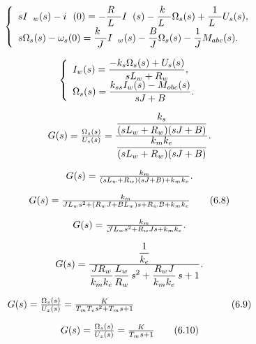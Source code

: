 \documentclass{article}
\begin{document}
\[
$$
\left\{\begin{array} {l} {s I_{\phantom{w} w} ( s )-i_{\phantom{w}} ( 0 )=-\displaystyle\frac{R_{\phantom{w}}} {L_{\phantom{w}}} I_{\phantom{w}} ( s )-\displaystyle\frac{k_{\phantom{s}}} {L_{\phantom{w}}} \Omega_{s} ( s )+\displaystyle\frac{1} {L_{\phantom{w}}} U_{s} ( s ),} \\ {s \Omega_{s} ( s )-\omega_{s} ( 0 )=\displaystyle\frac{k_{\phantom{w}}} {J} I_{\phantom{w} w} ( s )-\displaystyle\frac{B} {J} \Omega_{s} ( s )-\displaystyle\frac{1} {J} M_{a b c} ( s ).} \\ \end{array} \right.
$$
\]

\[
$$
\left\{\begin{array} {l} {I_{w} ( s )=\displaystyle\frac{-k_{s} \Omega_{s} ( s )+U_{s} ( s )} {s L_{w}+R_{w}},} \\ {\Omega_{s} ( s )=\displaystyle\frac{k_{s s} I_{w} ( s )-M_{o b c} ( s )} {s J+B}.} \\ \end{array} \right.
$$
\]

\[
$$
G ( s )=\frac{\Omega_{s} ( s )} {U_{s} ( s )}=\frac{\displaystyle{\frac{k_{s}} {( s L_{w}+R_{w} ) ( s J+B )}}} {\displaystyle{\frac{k_{m} k_{e}} {( s L_{w}+R_{w} ) ( s J+B )}}}.
$$
\]

\[
$$
G ( s )=\frac{k_{m}} {( s L_{w}+R_{w} ) ( s J+B )+k_{m} k_{e}}.
$$
\]

\[
$$
G ( s )=\frac{k_{m}} {J L_{w} s^{2}+( R_{w} J+B L_{w} ) s+R_{w} B+k_{m} k_{e}} \tag{6.8}
$$
\]

\[
$$
G ( s )=\frac{k_{m}} {{\cal J} L_{w} s^{2}+R_{w} J s+k_{m} k_{e}}.
$$
\]

\[
$$
G ( s )=\frac{\displaystyle{\frac{1} {k_{e}}}} {\displaystyle{\frac{J R_{w}} {k_{m} k_{e}}} \displaystyle{\frac{L_{w}} {R_{w}}} \, s^{2}+\displaystyle{\frac{R_{w} J} {k_{m} k_{e}}} \, s+1}.
$$
\]

\[
$$
G ( s )=\frac{\Omega_{s} ( s )} {U_{z} ( s )}=\frac{K} {T_{m} T_{e} s^{2}+T_{m} s+1} \qquad\qquad\qquad\qquad\qquad( 6. 9 )
$$
\]

\[
$$
G ( s )=\frac{\Omega_{s} \left( s \right)} {U_{z} \left( s \right)}=\frac{K} {T_{m} s+1} \tag{6.10}
$$
\]
\end{document}
